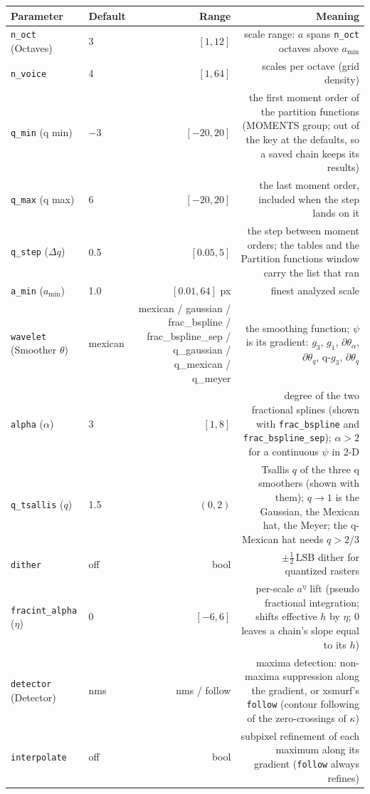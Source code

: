 \documentclass[10pt]{article}
\begin{document}
\begin{longtable}{P l R N}
\toprule Parameter & Default & Range & Meaning \\ \midrule
\texttt{n\_oct} (Octaves) & 3 & $[1,12]$ & scale range: $a$ spans \texttt{n\_oct} octaves above $a_{\min}$ \\
\texttt{n\_voice} & 4 & $[1,64]$ & scales per octave (grid density) \\
\texttt{q\_min} (q min) & $-3$ & $[-20,20]$ & the first moment order of the partition functions (MOMENTS group; out of the key at the defaults, so a saved chain keeps its results) \\
\texttt{q\_max} (q max) & 6 & $[-20,20]$ & the last moment order, included when the step lands on it \\
\texttt{q\_step} ($\Delta q$) & 0.5 & $[0.05,5]$ & the step between moment orders; the tables and the Partition functions window carry the list that ran \\
\texttt{a\_min} ($a_{\min}$) & 1.0 & $[0.01,64]$ px & finest analyzed scale \\
\texttt{wavelet} (Smoother $\theta$) & mexican & mexican / gaussian / frac\_bspline / frac\_bspline\_sep / q\_gaussian / q\_mexican / q\_meyer & the smoothing function; $\psi$ is its gradient: $g_3$, $g_1$, $\partial\theta_\alpha$, $\partial\theta_q$, q-$g_3$, $\partial\theta_q$ \\
\texttt{alpha} ($\alpha$) & 3 & $[1,8]$ & degree of the two fractional splines (shown with \texttt{frac\_bspline} and \texttt{frac\_bspline\_sep}); $\alpha>2$ for a continuous $\psi$ in 2-D \\
\texttt{q\_tsallis} ($q$) & 1.5 & $(0,2)$ & Tsallis $q$ of the three q smoothers (shown with them); $q\to1$ is the Gaussian, the Mexican hat, the Meyer; the q-Mexican hat needs $q>2/3$ \\
\texttt{dither} & off & bool & $\pm\tfrac12$\,LSB dither for quantized rasters \\
\texttt{fracint\_alpha} ($\eta$) & 0 & $[-6,6]$ & per-scale $a^{\eta}$ lift (pseudo fractional integration; shifts effective $h$ by $\eta$; 0 leaves a chain's slope equal to its $h$) \\
\texttt{detector} (Detector) & nms & nms / follow & maxima detection: non-maxima suppression along the gradient, or xsmurf's \texttt{follow} (contour following of the zero-crossings of $\kappa$) \\
\texttt{interpolate} & off & bool & subpixel refinement of each maximum along its gradient (\texttt{follow} always refines) \\

\end{longtable}
\end{document}
